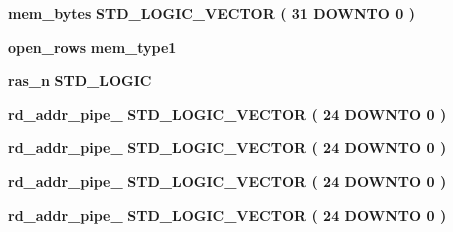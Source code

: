 \begin{DoxyCompactItemize}
\item 
{\bf mem\+\_\+bytes} {\bfseries \textcolor{comment}{S\+T\+D\+\_\+\+L\+O\+G\+I\+C\+\_\+\+V\+E\+C\+T\+OR}\textcolor{vhdlchar}{ }\textcolor{vhdlchar}{(}\textcolor{vhdlchar}{ }\textcolor{vhdlchar}{ } \textcolor{vhdldigit}{31} \textcolor{vhdlchar}{ }\textcolor{keywordflow}{D\+O\+W\+N\+TO}\textcolor{vhdlchar}{ }\textcolor{vhdlchar}{ } \textcolor{vhdldigit}{0} \textcolor{vhdlchar}{ }\textcolor{vhdlchar}{)}\textcolor{vhdlchar}{ }} 
\item 
{\bf open\+\_\+rows} {\bfseries {\bfseries {\bf mem\+\_\+type1}} \textcolor{vhdlchar}{ }} 
\item 
{\bf ras\+\_\+n} {\bfseries \textcolor{comment}{S\+T\+D\+\_\+\+L\+O\+G\+IC}\textcolor{vhdlchar}{ }} 
\item 
{\bf rd\+\_\+addr\+\_\+pipe\+\_} {\bfseries \textcolor{comment}{S\+T\+D\+\_\+\+L\+O\+G\+I\+C\+\_\+\+V\+E\+C\+T\+OR}\textcolor{vhdlchar}{ }\textcolor{vhdlchar}{(}\textcolor{vhdlchar}{ }\textcolor{vhdlchar}{ } \textcolor{vhdldigit}{24} \textcolor{vhdlchar}{ }\textcolor{keywordflow}{D\+O\+W\+N\+TO}\textcolor{vhdlchar}{ }\textcolor{vhdlchar}{ } \textcolor{vhdldigit}{0} \textcolor{vhdlchar}{ }\textcolor{vhdlchar}{)}\textcolor{vhdlchar}{ }} 
\item 
{\bf rd\+\_\+addr\+\_\+pipe\+\_} {\bfseries \textcolor{comment}{S\+T\+D\+\_\+\+L\+O\+G\+I\+C\+\_\+\+V\+E\+C\+T\+OR}\textcolor{vhdlchar}{ }\textcolor{vhdlchar}{(}\textcolor{vhdlchar}{ }\textcolor{vhdlchar}{ } \textcolor{vhdldigit}{24} \textcolor{vhdlchar}{ }\textcolor{keywordflow}{D\+O\+W\+N\+TO}\textcolor{vhdlchar}{ }\textcolor{vhdlchar}{ } \textcolor{vhdldigit}{0} \textcolor{vhdlchar}{ }\textcolor{vhdlchar}{)}\textcolor{vhdlchar}{ }} 
\item 
{\bf rd\+\_\+addr\+\_\+pipe\+\_} {\bfseries \textcolor{comment}{S\+T\+D\+\_\+\+L\+O\+G\+I\+C\+\_\+\+V\+E\+C\+T\+OR}\textcolor{vhdlchar}{ }\textcolor{vhdlchar}{(}\textcolor{vhdlchar}{ }\textcolor{vhdlchar}{ } \textcolor{vhdldigit}{24} \textcolor{vhdlchar}{ }\textcolor{keywordflow}{D\+O\+W\+N\+TO}\textcolor{vhdlchar}{ }\textcolor{vhdlchar}{ } \textcolor{vhdldigit}{0} \textcolor{vhdlchar}{ }\textcolor{vhdlchar}{)}\textcolor{vhdlchar}{ }} 
\item 
{\bf rd\+\_\+addr\+\_\+pipe\+\_} {\bfseries \textcolor{comment}{S\+T\+D\+\_\+\+L\+O\+G\+I\+C\+\_\+\+V\+E\+C\+T\+OR}\textcolor{vhdlchar}{ }\textcolor{vhdlchar}{(}\textcolor{vhdlchar}{ }\textcolor{vhdlchar}{ } \textcolor{vhdldigit}{24} \textcolor{vhdlchar}{ }\textcolor{keywordflow}{D\+O\+W\+N\+TO}\textcolor{vhdlchar}{ }\textcolor{vhdlchar}{ } \textcolor{vhdldigit}{0} \textcolor{vhdlchar}{ }\textcolor{vhdlchar}{)}\textcolor{vhdlchar}{ }} 

\end{DoxyCompactItemize}
